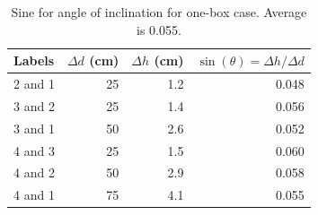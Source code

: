 \begin{table}[ht]
    \centering
    \begin{tabular}{|l|r|r|r|}
        \hline
        Labels & $\Delta d$ (cm) & $\Delta h$ (cm) & $\sin(\theta) = \Delta h / \Delta d$ \\
        \hline
        2 and 1 & 25 & 1.2 & 0.048 \\
        3 and 2 & 25 & 1.4 & 0.056 \\
        3 and 1 & 50 & 2.6 & 0.052 \\
        4 and 3 & 25 & 1.5 & 0.060 \\
        4 and 2 & 50 & 2.9 & 0.058 \\
        4 and 1 & 75 & 4.1 & 0.055 \\
        \hline
    \end{tabular}
    \caption{Sine for angle of inclination for one-box case. Average is 0.055.}
    \label{table:02.sine.1}
\end{table}
\FloatBarrier
\newpage
